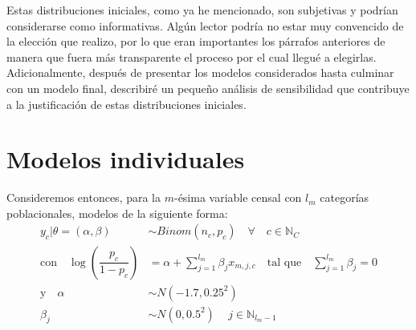 Estas distribuciones iniciales, como ya he mencionado, son subjetivas y podrían considerarse como informativas. Algún lector podría no estar muy convencido de la elección que realizo, por lo que eran importantes los párrafos anteriores de manera que fuera más transparente el proceso por el cual llegué a elegirlas. Adicionalmente, después de presentar los modelos considerados hasta culminar con un modelo final, describiré un pequeño análisis de sensibilidad que contribuye a la justificación de estas distribuciones iniciales.  

\section{Modelos individuales}

Consideremos entonces, para la $m$-ésima variable censal con $l_m$ categorías poblacionales, modelos de la siguiente forma:
\begin{align}\label{eq:Modelo_Nal_Ind}
y_c|\theta=(\alpha,\beta) & \sim Binom(n_c,p_c) \quad \forall \quad c \in \mathbb{N}_C \nonumber \\
\text{con} \quad \log\left(\dfrac{p_c}{1-p_c}\right) &= \alpha + \sum\limits_{j=1}^{l_m} \beta_j x_{m,j,c} \quad \text{tal que} \quad \sum\limits_{j = 1}^{l_m} \beta_j = 0 \nonumber \\
\text{y} \quad \alpha & \sim N(-1.7,0.25^2) \nonumber \\
\beta_j & \sim N(0,0.5^2) \quad \, j \in \mathbb{N}_{l_m-1} 
\end{align}

